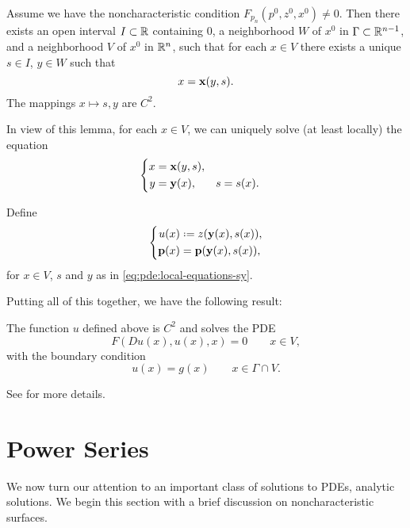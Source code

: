 \begin{lemma}
  Assume we have the noncharacteristic condition \(F_{p_n}(p^0,z^0,x^0)\neq
  0\). Then there exists an open interval \(I\subset\mathbb{R}\) containing
  \(0\), a neighborhood \(W\) of \(x^0\) in \(\Gamma\subset\mathbb{R}^{n-1}\),
  and a neighborhood \(V\) of \(x^0\) in \(\mathbb{R}^n\), such that for each
  \(x\in V\) there exists a unique \(s\in I\), \(y\in W\) such that
  \[
    x=\mathbf{x}(y,s).
  \]
  The mappings \(x\mapsto s,y\) are \(C^2\).
\end{lemma}

In view of this lemma, for each \(x\in V\), we can uniquely solve (at least
locally) the equation
\begin{equation}
  \label{eq:pde:local-equations-sy}
  \left\{
    \begin{aligned}
      x&=\mathbf{x}(y,s),\\
      y&=\mathbf{y}(x),&s&=s(x).
    \end{aligned}
  \right.
\end{equation}

Define
\begin{equation}
  \label{eq:pde:solution-in-sy}
  \left\{
    \begin{aligned}
      u(x)&\defeq z(\bfy(x),s(x)),\\
      \bfp(x)&=\bfp(\bfy(x),s(x)),
    \end{aligned}
  \right.
\end{equation}
for \(x\in V\), \(s\) and \(y\) as in \eqref{eq:pde:local-equations-sy}.

Putting all of this together, we have the following result:
\begin{theorem}
  The function \(u\) defined above is \(C^2\) and solves the PDE
  \[
    F(Du(x),u(x),x)=0\qquad x\in V,
  \]
  with the boundary condition
  \[
    u(x)=g(x)\qquad x\in \Gamma\cap V.
  \]
\end{theorem}
See \cite[\S 3.2.4]{evans} for more details.

\section{Power Series}
We now turn our attention to an important class of solutions to PDEs,
analytic solutions. We begin this section with a brief discussion on
noncharacteristic surfaces.


